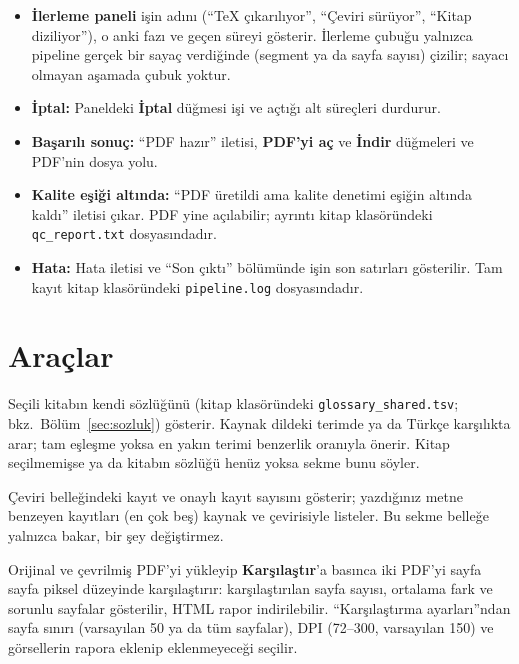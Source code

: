 \documentclass[11pt,a4paper]{article}
\newcommand{\dugme}[1]{\textsf{\bfseries #1}}
\newcommand{\dosya}[1]{\texttt{#1}}
\begin{document}
\begin{itemize}
  \item \textbf{İlerleme paneli} işin adını (``TeX çıkarılıyor'', ``Çeviri
        sürüyor'', ``Kitap diziliyor''), o anki fazı ve geçen süreyi
        gösterir. İlerleme çubuğu yalnızca pipeline gerçek bir sayaç
        verdiğinde (segment ya da sayfa sayısı) çizilir; sayacı olmayan
        aşamada çubuk yoktur.
  \item \textbf{İptal:} Paneldeki \dugme{İptal} düğmesi işi ve açtığı alt
        süreçleri durdurur.
  \item \textbf{Başarılı sonuç:} ``PDF hazır'' iletisi, \dugme{PDF'yi aç} ve
        \dugme{İndir} düğmeleri ve PDF'nin dosya yolu.
  \item \textbf{Kalite eşiği altında:} ``PDF üretildi ama kalite denetimi
        eşiğin altında kaldı'' iletisi çıkar. PDF yine açılabilir; ayrıntı
        kitap klasöründeki \dosya{qc\_report.txt} dosyasındadır.
  \item \textbf{Hata:} Hata iletisi ve ``Son çıktı'' bölümünde işin son
        satırları gösterilir. Tam kayıt kitap klasöründeki
        \dosya{pipeline.log} dosyasındadır.
\end{itemize}

\section{Araçlar}\label{sec:araclar}

\begin{description}[style=nextline]
  \item[Terimler] Seçili kitabın kendi sözlüğünü (kitap klasöründeki
        \dosya{glossary\_shared.tsv}; bkz.\ Bölüm~\ref{sec:sozluk}) gösterir.
        Kaynak dildeki terimde ya da Türkçe karşılıkta arar; tam eşleşme yoksa
        en yakın terimi benzerlik oranıyla önerir. Kitap seçilmemişse ya da
        kitabın sözlüğü henüz yoksa sekme bunu söyler.
  \item[Bellek] Çeviri belleğindeki kayıt ve onaylı kayıt sayısını gösterir;
        yazdığınız metne benzeyen kayıtları (en çok beş) kaynak ve
        çevirisiyle listeler. Bu sekme belleğe yalnızca bakar, bir şey
        değiştirmez.
  \item[Karşılaştırma] Orijinal ve çevrilmiş PDF'yi yükleyip
        \dugme{Karşılaştır}'a basınca iki PDF'yi sayfa sayfa piksel düzeyinde
        karşılaştırır: karşılaştırılan sayfa sayısı, ortalama fark ve sorunlu
        sayfalar gösterilir, HTML rapor indirilebilir. ``Karşılaştırma
        ayarları''ndan sayfa sınırı (varsayılan 50 ya da tüm sayfalar), DPI
        (72--300, varsayılan 150) ve görsellerin rapora eklenip eklenmeyeceği
        seçilir.
\end{description}
\end{document}
